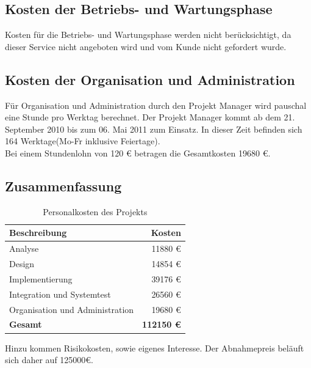 \subsection{Kosten der Betriebs- und Wartungsphase}

Kosten für die Betriebs- und Wartungsphase werden nicht berücksichtigt, da
dieser Service nicht angeboten wird und vom Kunde nicht gefordert wurde.

\subsection{Kosten der Organisation und Administration}

Für Organisation und Administration durch den Projekt Manager wird pauschal eine
Stunde pro Werktag berechnet. Der Projekt Manager kommt ab dem 21. September
2010 bis zum 06. Mai 2011 zum Einsatz. In dieser Zeit befinden sich 164
Werktage(Mo-Fr inklusive Feiertage).\\
Bei einem Stundenlohn von 120 € betragen die Gesamtkosten 19680 €.%

\subsection{Zusammenfassung}

\begin{table}[H]
\caption{Personalkosten des Projekts}
\label{tab:ktotal}
\begin{center}
\begin{tabular}{|l|r|}
\hline
\textbf{Beschreibung} & \textbf{Kosten}\\
\hline
Analyse & 11880 €\\
\hline
Design & 14854 €\\
\hline
Implementierung & 39176 €\\
\hline
Integration und Systemtest & 26560 €\\
\hline
Organisation und Administration & 19680 €\\
\hline
\textbf{Gesamt} & \textbf{112150 €} \\ %
\hline
\end{tabular}
\end{center}
\label{default}
\end{table}

Hinzu kommen Risikokosten, sowie eigenes Interesse. Der Abnahmepreis beläuft
sich daher auf 125000€.

